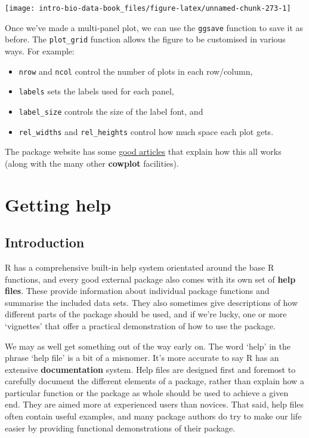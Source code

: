 \documentclass[
]{book}
\providecommand{\tightlist}{%
  \setlength{\itemsep}{0pt}\setlength{\parskip}{0pt}}
\begin{document}
\begin{center}\texttt{[image: intro-bio-data-book\_files/figure-latex/unnamed-chunk-273-1]} \end{center}

Once we've made a multi-panel plot, we can use the \texttt{ggsave} function to save it as before. The \texttt{plot\_grid} function allows the figure to be customised in various ways. For example:

\begin{itemize}
\tightlist
\item
  \texttt{nrow} and \texttt{ncol} control the number of plots in each row/column,
\item
  \texttt{labels} sets the labels used for each panel,
\item
  \texttt{label\_size} controls the size of the label font, and
\item
  \texttt{rel\_widths} and \texttt{rel\_heights} control how much space each plot gets.
\end{itemize}

The package website has some \href{https://wilkelab.org/cowplot/articles/index.html}{good articles} that explain how this all works (along with the many other \textbf{cowplot} facilities).

\hypertarget{appendix-supplementary-material}{%
\appendix}


\hypertarget{getting-help}{%
\chapter{Getting help}\label{getting-help}}

\hypertarget{console-help}{%
\section{Introduction}\label{console-help}}

R has a comprehensive built-in help system orientated around the base R functions, and every good external package also comes with its own set of \textbf{help files}. These provide information about individual package functions and summarise the included data sets. They also sometimes give descriptions of how different parts of the package should be used, and if we're lucky, one or more `vignettes' that offer a practical demonstration of how to use the package.

We may as well get something out of the way early on. The word `help' in the phrase `help file' is a bit of a misnomer. It's more accurate to say R has an extensive \textbf{documentation} system. Help files are designed first and foremost to carefully document the different elements of a package, rather than explain how a particular function or the package as whole should be used to achieve a given end. They are aimed more at experienced users than novices. That said, help files often contain useful examples, and many package authors do try to make our life easier by providing functional demonstrations of their package.
\end{document}
